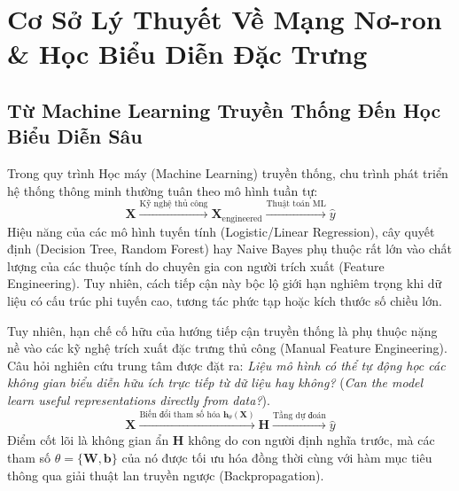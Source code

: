 \documentclass[12pt,a4paper]{report}
\begin{document}
\tableofcontents
\newpage
\listoffigures
\newpage
\listoftables
\newpage
{}

\chapter{Cơ Sở Lý Thuyết Về Mạng Nơ-ron \& Học Biểu Diễn Đặc Trưng}

\section{Từ Machine Learning Truyền Thống Đến Học Biểu Diễn Sâu}
Trong quy trình Học máy (Machine Learning) truyền thống, chu trình phát triển hệ thống thông minh thường tuân theo mô hình tuần tự:
\begin{equation}
    \mathbf{X} \xrightarrow{\text{Kỹ nghệ thủ công}} \mathbf{X}_{\text{engineered}} \xrightarrow{\text{Thuật toán ML}} \hat{y}
\end{equation}
Hiệu năng của các mô hình tuyến tính (Logistic/Linear Regression), cây quyết định (Decision Tree, Random Forest) hay Naive Bayes phụ thuộc rất lớn vào chất lượng của các thuộc tính do chuyên gia con người trích xuất (Feature Engineering). Tuy nhiên, cách tiếp cận này bộc lộ giới hạn nghiêm trọng khi dữ liệu có cấu trúc phi tuyến cao, tương tác phức tạp hoặc kích thước số chiều lớn.

Tuy nhiên, hạn chế cố hữu của hướng tiếp cận truyền thống là phụ thuộc nặng nề vào các kỹ nghệ trích xuất đặc trưng thủ công (Manual Feature Engineering). Câu hỏi nghiên cứu trung tâm được đặt ra: \textit{Liệu mô hình có thể tự động học các không gian biểu diễn hữu ích trực tiếp từ dữ liệu hay không?} (\textit{Can the model learn useful representations directly from data?}).
\begin{equation}
    \mathbf{X} \xrightarrow{\text{Biến đổi tham số hóa } \mathbf{h}_\theta(\mathbf{X})} \mathbf{H} \xrightarrow{\text{Tầng dự đoán}} \hat{y}
\end{equation}
Điểm cốt lõi là không gian ẩn $\mathbf{H}$ không do con người định nghĩa trước, mà các tham số $\theta = \{\mathbf{W}, \mathbf{b}\}$ của nó được tối ưu hóa đồng thời cùng với hàm mục tiêu thông qua giải thuật lan truyền ngược (Backpropagation).
\end{document}
